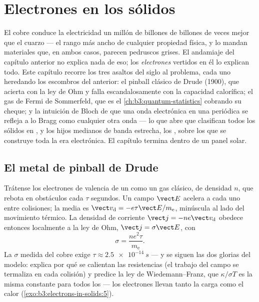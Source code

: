 \chapter{Electrones en los sólidos}\label{ch:b3:electrons-in-solids}


El cobre conduce la electricidad un millón de billones de billones de veces mejor
que el cuarzo --- el rango más ancho de cualquier propiedad física, y lo mandan
materiales que, en ambos casos, parecen pedruscos grises. El andamiaje del
capítulo anterior no explica nada de eso; los \emph{electrones} vertidos en
él lo explican todo. Este capítulo recorre los tres asaltos del siglo al
problema, cada uno heredando los escombros del anterior: el pinball clásico de
Drude (1900), que acierta con la ley de Ohm y falla escandalosamente con la
capacidad calorífica; el gas de Fermi de Sommerfeld, que es
el \cref{ch:b3:quantum-statistics} cobrando su cheque; y la intuición de Bloch de que
una onda electrónica en una  periódica se refleja a lo Bragg
como cualquier otra onda --- lo que abre \emph{} que clasifican todos los sólidos
en ,  y los hijos medianos de banda estrecha, los
, sobre los que se construye toda la era electrónica. El
capítulo termina dentro de un panel solar.

\section{El metal de pinball de Drude}

\begin{proposition}\label{prop:b3:electrons-in-solids:drude}
Trátense los electrones de valencia de un  como un gas clásico, de densidad $n$,
que rebota en obstáculos cada $\tau$ segundos. Un campo $\vect E$
acelera a cada uno entre colisiones; la \emph{}
media es $\vect v_{\text{d}} = -e\tau\vect E/m_{\text{e}}$,
minúscula al lado del movimiento térmico. La densidad de corriente $\vect j =
-ne\vect v_{\text{d}}$ obedece entonces localmente a la ley de Ohm,
$\vect j = \sigma\vect E$, con
\[
\sigma = \frac{ne^2\tau}{m_{\text{e}}} .
\]
La $\sigma$ medida del cobre exige $\tau \approx \qty{2.5e-14}{s}$
--- y se siguen las dos glorias del modelo: explica por qué se calientan las
resistencias (el trabajo del campo se termaliza en cada colisión) y
predice la ley de Wiedemann--Franz, que $\kappa/\sigma T$ es la
misma constante para todos los  --- los electrones llevan tanto la carga como el
calor (\cref{exo:b3:electrons-in-solids:5}).
\end{proposition}

